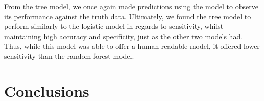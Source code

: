 \documentclass[]{article}
\begin{document}
From the tree model, we once again made predictions using the model to
observe its performance against the truth data. Ultimately, we found the
tree model to perform similarly to the logistic model in regards to
sensitivity, whilst maintaining high accuracy and specificity, just as
the other two models had. Thus, while this model was able to offer a
human readable model, it offered lower sensitivity than the random
forest model.

\hypertarget{conclusions}{%
\section{Conclusions}\label{conclusions}}
\end{document}
